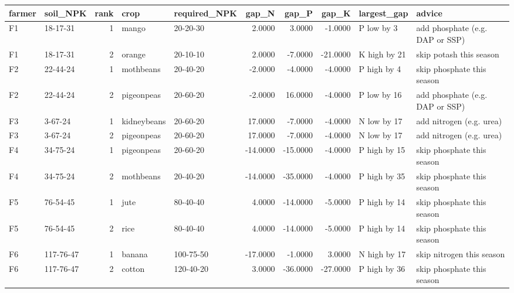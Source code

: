 \begin{tabular}{llrllrrrll}
\toprule
farmer & soil_NPK & rank & crop & required_NPK & gap_N & gap_P & gap_K & largest_gap & advice \\
\midrule
F1 & 18-17-31 & 1 & mango & 20-20-30 & 2.0000 & 3.0000 & -1.0000 & P low by 3 & add phosphate (e.g. DAP or SSP) \\
F1 & 18-17-31 & 2 & orange & 20-10-10 & 2.0000 & -7.0000 & -21.0000 & K high by 21 & skip potash this season \\
F2 & 22-44-24 & 1 & mothbeans & 20-40-20 & -2.0000 & -4.0000 & -4.0000 & P high by 4 & skip phosphate this season \\
F2 & 22-44-24 & 2 & pigeonpeas & 20-60-20 & -2.0000 & 16.0000 & -4.0000 & P low by 16 & add phosphate (e.g. DAP or SSP) \\
F3 & 3-67-24 & 1 & kidneybeans & 20-60-20 & 17.0000 & -7.0000 & -4.0000 & N low by 17 & add nitrogen (e.g. urea) \\
F3 & 3-67-24 & 2 & pigeonpeas & 20-60-20 & 17.0000 & -7.0000 & -4.0000 & N low by 17 & add nitrogen (e.g. urea) \\
F4 & 34-75-24 & 1 & pigeonpeas & 20-60-20 & -14.0000 & -15.0000 & -4.0000 & P high by 15 & skip phosphate this season \\
F4 & 34-75-24 & 2 & mothbeans & 20-40-20 & -14.0000 & -35.0000 & -4.0000 & P high by 35 & skip phosphate this season \\
F5 & 76-54-45 & 1 & jute & 80-40-40 & 4.0000 & -14.0000 & -5.0000 & P high by 14 & skip phosphate this season \\
F5 & 76-54-45 & 2 & rice & 80-40-40 & 4.0000 & -14.0000 & -5.0000 & P high by 14 & skip phosphate this season \\
F6 & 117-76-47 & 1 & banana & 100-75-50 & -17.0000 & -1.0000 & 3.0000 & N high by 17 & skip nitrogen this season \\
F6 & 117-76-47 & 2 & cotton & 120-40-20 & 3.0000 & -36.0000 & -27.0000 & P high by 36 & skip phosphate this season \\
\bottomrule
\end{tabular}
